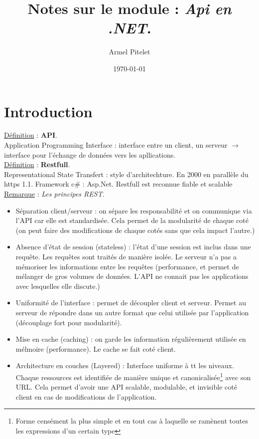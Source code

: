 \documentclass[a4paper,12pt,twoside]{article}
\title{Notes sur le module : \textit{Api en .NET}.}
\author{Armel Pitelet}
\date{\today}
\newcommand{\rem}[2]{\noindent\underline{Remarque} : \textit{#1}.\\ \indent #2}
\newcommand{\defi}[2]{\noindent\underline{Définition} : \textbf{#1}.\\ \indent #2}
\begin{document}
\maketitle
\tableofcontents

\section{Introduction}

\defi{API}{Application Programming Interface : interface entre un client, un serveur $\to$ interface pour l'échange de données vers les apllications.}\\

\defi{Restfull}{Representational State Transfert  : style d'architechture. En 2000 en parallèle du https 1.1. Framework c\# : Asp.Net. Restfull est reconnue fiable et scalable}\\

\rem{Les principes REST}{\begin{itemize} 
\item Séparation client/serveur : on sépare les responsabilité et on communique via l'API car elle est standardisée. Cela permet de la modularité de chaque coté (on peut faire des modifications de chaque cotés sans que cela impact l'autre.)
\item Absence d'état de session (stateless) : l'état d'une session est inclus dans une requête. Les requêtes sont traités de manière isolée. Le serveur n'a pas a mémoriser les informations entre les requêtes (performance, et permet de mélanger de gros volumes de données. L'API ne connait pas les applications avec lesquelles elle discute.)
\item Uniformité de l'interface : permet de découpler client et serveur. Permet au serveur de répondre dans un autre format que celui utilisée par l'application (découplage fort pour modularité).
\item Mise en cache (caching) : on garde les information régulièrement utilisée en mélmoire (performance). Le cache se fait coté client.
\item Architecture en couches (Layered) : Interface uniforme à tt les niveaux. Chaque ressources est identifiée de manière unique et canonicalisée\footnote{Forme censément la plus simple et en tout cas à laquelle se ramènent toutes les expressions d’un certain type} avec son URL. Cela permet d'avoir une API scalable, modulable, et invisible coté client en cas de modifications de l'application.\\
\end{itemize}}
\end{document}
